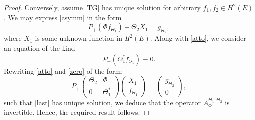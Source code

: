 \documentclass[10pt,a4paper]{amsart}
\begin{document}
\begin{proof}
Conversely, assume \eqref{TG} has unique solution for arbitrary $f_{1}, f_{2}\in H^{2}(E)$. We may express  \eqref{asymm} in the form
 \begin{equation}\label{atto}
 P_{+}(\Phi f_{\Theta_{1}})+\Theta_{2}X_{1}=g_{\Theta_{2}},
 \end{equation}
 where $X_{1}$ is some unknown function in %
  $H^{2}(E)$. Along with \eqref{atto}, we consider an equation of the kind
 \begin{equation}\label{zero}
 P_{+}(\Theta_{1}^{*}f_{\Theta_{1}})=0.
 \end{equation}
 Rewriting \eqref{atto} and \eqref{zero} of the form:
 \begin{equation}\label{last}
P_{+}\begin{pmatrix}
\Theta_{2}& \Phi\\
0&\Theta_{1}^{*}
\end{pmatrix}
\begin{pmatrix}
X_{1}\\
f_{\Theta_{1}}
\end{pmatrix}
=\begin{pmatrix}
g_{\Theta_{2}}\\
0
\end{pmatrix},
\end{equation}
such that \eqref{last} has unique solution, we deduce that the operator $A_{\Phi}^{\Theta_{1},\Theta_{2}}$ is invertible. Hence, the required result follows.
\end{proof}
\end{document}
